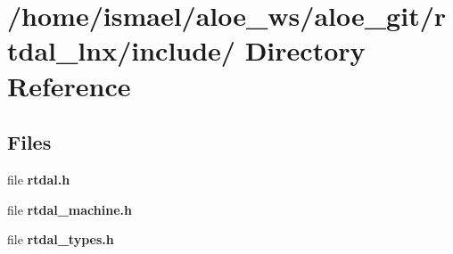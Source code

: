 \section{/home/ismael/aloe\-\_\-ws/aloe\-\_\-git/rtdal\-\_\-lnx/include/ Directory Reference}
\label{dir_120096de271b42d25ebef784702e3ff3}
\subsection*{Files}
\begin{DoxyCompactItemize}
\item 
file {\bf rtdal.\-h}
\item 
file {\bf rtdal\-\_\-machine.\-h}
\item 
file {\bf rtdal\-\_\-types.\-h}
\end{DoxyCompactItemize}
